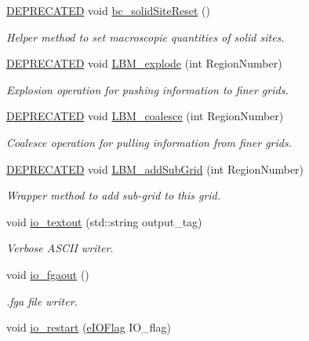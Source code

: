 \begin{DoxyCompactItemize}
\hyperlink{stdafx_8h_ac1e8a42306d8e67cb94ca31c3956ee78}{D\+E\+P\+R\+E\+C\+A\+T\+ED} void \hyperlink{class_grid_obj_ac86a233f9475084226e6bf651ffe398f}{bc\+\_\+solid\+Site\+Reset} ()
\begin{DoxyCompactList}\small\item\em Helper method to set macroscopic quantities of solid sites. \end{DoxyCompactList}\item 
\hyperlink{stdafx_8h_ac1e8a42306d8e67cb94ca31c3956ee78}{D\+E\+P\+R\+E\+C\+A\+T\+ED} void \hyperlink{class_grid_obj_ad8086651bd7b978e0b9c48d56c3d0595}{L\+B\+M\+\_\+explode} (int Region\+Number)
\begin{DoxyCompactList}\small\item\em Explosion operation for pushing information to finer grids. \end{DoxyCompactList}\item 
\hyperlink{stdafx_8h_ac1e8a42306d8e67cb94ca31c3956ee78}{D\+E\+P\+R\+E\+C\+A\+T\+ED} void \hyperlink{class_grid_obj_a5832081a70e8990be62317034bb975c6}{L\+B\+M\+\_\+coalesce} (int Region\+Number)
\begin{DoxyCompactList}\small\item\em Coalesce operation for pulling information from finer grids. \end{DoxyCompactList}\item 
\hyperlink{stdafx_8h_ac1e8a42306d8e67cb94ca31c3956ee78}{D\+E\+P\+R\+E\+C\+A\+T\+ED} void \hyperlink{class_grid_obj_ab0d47be7ccafaa84b5d43da69e2082b9}{L\+B\+M\+\_\+add\+Sub\+Grid} (int Region\+Number)
\begin{DoxyCompactList}\small\item\em Wrapper method to add sub-\/grid to this grid. \end{DoxyCompactList}\item 
void \hyperlink{class_grid_obj_a1f334215b7789ea1ad8e2d1e15c67fb2}{io\+\_\+textout} (std\+::string output\+\_\+tag)
\begin{DoxyCompactList}\small\item\em Verbose A\+S\+C\+II writer. \end{DoxyCompactList}\item 
void \hyperlink{class_grid_obj_aa80aecb06d7a420865c32b8acc15581e}{io\+\_\+fgaout} ()
\begin{DoxyCompactList}\small\item\em .fga file writer. \end{DoxyCompactList}\item 
void \hyperlink{class_grid_obj_a94551d2e383da4b2a2c930488d436a42}{io\+\_\+restart} (\hyperlink{_grid_obj_8h_ad1926c22ad82853adff44c4b76b97827}{e\+I\+O\+Flag} I\+O\+\_\+flag)

\end{DoxyCompactItemize}
